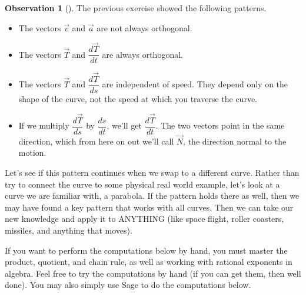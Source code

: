 \documentclass[10pt,]{book}
\theoremstyle{plain}
\theoremstyle{definition}
\theoremstyle{definition}
\newtheorem{observation}[theorem]{Observation}
\theoremstyle{definition}
\theoremstyle{definition}
\theoremstyle{definition}
\numberwithin{equation}{section}
\begin{document}
\begin{observation}[]\label{curvature_observations}
The previous exercise showed the following patterns. \leavevmode%
\begin{itemize}[label=\textbullet]
\item{}The vectors \(\vec v\) and \(\vec a\) are not always orthogonal.%
\item{}The vectors \(\vec T\) and \(\dfrac{d\vec T}{dt}\) are always orthogonal.%
\item{}The vectors \(\vec T\) and \(\dfrac{d\vec T}{ds}\) are independent of speed. They depend only on the shape of the curve, not the speed at which you traverse the curve.%
\item{}If we multiply \(\dfrac{d\vec T}{ds}\) by \(\dfrac{ds}{dt}\), we'll get \(\dfrac{d\vec T}{dt}\). The two vectors point in the same direction, which from here on out we'll call \(\vec N\), the direction normal to the motion.%
\end{itemize}
%
\end{observation}
Let's see if this pattern continues when we swap to a different curve. Rather than try to connect the curve to some physical real world example, let's look at a curve we are familiar with, a parabola. If the pattern holds there as well, then we may have found a key pattern that works with all curves. Then we can take our new knowledge and apply it to ANYTHING (like space flight, roller coasters, missiles, and anything that moves).%
\par
If you want to perform the computations below by hand, you must master the product, quotient, and chain rule, as well as working with rational exponents in algebra. Feel free to try the computations by hand (if you can get them, then well done). You may also simply use Sage to do the computations below.%
\end{document}
